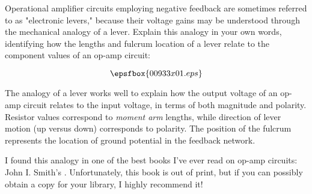 

Operational amplifier circuits employing negative feedback are sometimes referred to as "electronic levers," because their voltage gains may be understood through the mechanical analogy of a lever.  Explain this analogy in your own words, identifying how the lengths and fulcrum location of a lever relate to the component values of an op-amp circuit:

$$\epsfbox{00933x01.eps}$$







The analogy of a lever works well to explain how the output voltage of an op-amp circuit relates to the input voltage, in terms of both magnitude and polarity.  Resistor values correspond to {\it moment arm} lengths, while direction of lever motion (up versus down) corresponds to polarity.  The position of the fulcrum represents the location of ground potential in the feedback network.







I found this analogy in one of the best books I've ever read on op-amp circuits: John I. Smith's .  Unfortunately, this book is out of print, but if you can possibly obtain a copy for your library, I highly recommend it!




